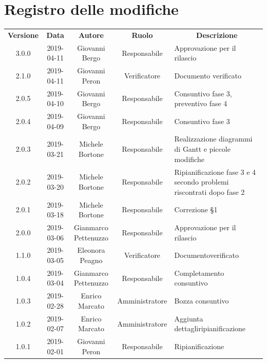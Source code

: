 \documentclass[11pt,a4paper]{article}
\begin{document}
	
	{\def\arraystretch{2}\tabcolsep=10pt
	\newpage
	\section*{\centering Registro delle modifiche}
	\begin{tabularx}{\textwidth}{ c | c | c | c | X }
		\rowcolor{LightBlue}
		\color{white}\bfseries Versione & 
		\color{white}\bfseries Data & 
		\color{white}\bfseries Autore & 
		\color{white}\bfseries Ruolo & 
		\multicolumn{1}{c}{\color{white}\bfseries Descrizione}\\[0.25cm]
		3.0.0 & 2019-04-11 & Giovanni Bergo & Responsabile & Approvazione per il rilascio\\ \hline
		2.1.0 & 2019-04-11 & Giovanni Peron & Verificatore &	Documento \newline verificato\\ \hline
		2.0.5 & 2019-04-10 & Giovanni Bergo & Responsabile &	Consuntivo fase 3, preventivo fase 4\\ \hline
		2.0.4 & 2019-04-09 & Giovanni Bergo & Responsabile & Consuntivo fase 3\\ \hline
		2.0.3 & 2019-03-21 & Michele Bortone & Responsabile & Realizzazione diagrammi di Gantt e piccole modifiche\\ \hline
		2.0.2 & 2019-03-20 & Michele Bortone & Responsabile & Ripianificazione fase 3 e 4 secondo problemi riscontrati dopo fase 2\\ \hline
		2.0.1 & 2019-03-18 & Michele Bortone & Responsabile & Correzione §1\\ \hline
		2.0.0 & 2019-03-06 & Gianmarco Pettenuzzo & Responsabile & Approvazione per il rilascio\\ \hline
		1.1.0 & 2019-03-05 & Eleonora Peagno & Verificatore & Documento\newline verificato\\ \hline
		1.0.4 & 2019-03-04 & Gianmarco Pettenuzzo & Responsabile & Completamento \newline consuntivo\\ \hline
		1.0.3 & 2019-02-28 & Enrico Marcato & Amministratore & Bozza consuntivo\\ \hline
		1.0.2 & 2019-02-07 & Enrico Marcato & Amministratore & Aggiunta dettagli\newline ripianificazione\\ \hline
		1.0.1 & 2019-02-01 & Giovanni Peron & Responsabile & Ripianificazione\\ \hline

\end{tabularx}}
\end{document}
